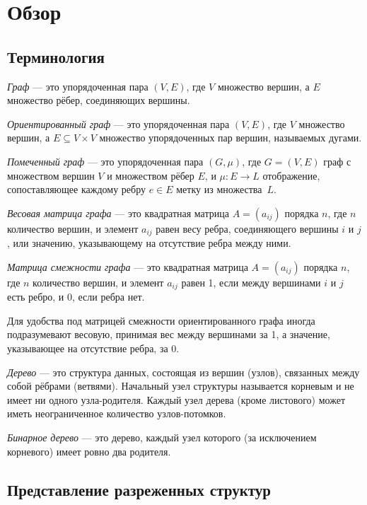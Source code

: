 
\section{Обзор}

\subsection{Терминология}

\textit{Граф} --- это упорядоченная пара $(V, E)$, где $V$ множество вершин, а $E$ множество рёбер, соединяющих вершины.

\textit{Ориентированный граф} --- это упорядоченная пара $(V, E)$, где $V$  множество вершин, а $E \subseteq V \times V$ множество упорядоченных пар вершин, называемых дугами.

\textit{Помеченный граф} --- это упорядоченная пара $(G, \mu)$, где $G = (V, E)$ граф с множеством вершин $V$ и множеством рёбер $E$, и $\mu: E \rightarrow L$ отображение, сопоставляющее каждому ребру $e \in E$ метку из множества~$L$.

\textit{Весовая матрица графа} --- это квадратная матрица $A = (a_{ij})$ порядка $n$, где $n$ количество вершин, и элемент $a_{ij}$ равен весу ребра, соединяющего вершины $i$ и $j$, или значению, указывающему на отсутствие ребра между ними.

\textit{Матрица смежности графа} --- это квадратная матрица $A = (a_{ij})$ порядка $n$, где $n$ количество вершин, и элемент $a_{ij}$ равен 1, если между вершинами $i$ и $j$ есть ребро, и 0, если ребра нет.

Для удобства под матрицей смежности ориентированного графа иногда подразумевают весовую, принимая вес между вершинами за 1, а значение, указывающее на отсутствие ребра, за 0. 

\textit{Дерево} --- это структура данных, состоящая из вершин (узлов), связанных между собой рёбрами (ветвями). Начальный узел структуры называется корневым и не имеет ни одного узла-родителя. Каждый узел дерева (кроме листового) может иметь неограниченное количество узлов-потомков. 

\textit{Бинарное дерево} --- это дерево, каждый узел которого (за исключением корневого) имеет ровно два родителя.

\newpage

\subsection{Представление разреженных структур}

